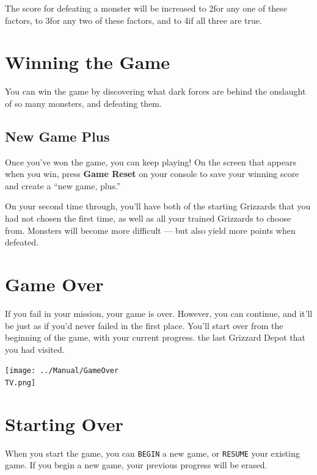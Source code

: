 \documentclass[10pt,twocolumn,openany,article]{memoir}
\newcommand\TV{NTSC}
\newcommand\TV{PAL}
\newcommand\TV{SECAM}
\begin{document}
The score for  defeating a monster will be increased  to 2\times for any
one of these  factors, to 3\times for  any two of these  factors, and to
4\times if all three are true.

\section{Winning the Game}

You can  win the  game by  discovering what dark  forces are  behind the
onslaught of so many monsters, and defeating them.

\subsection*{New Game Plus}\label{sec:NewGamePlus}

Once  you've won  the game,  you can  keep playing!  On the  screen that
appears when you win, press \textbf{Game  Reset} on your console to save
your winning score and create a ``new game, plus.''

On your second time through, you'll  have both of the starting Grizzards
that you  had not  chosen the first  time, as well  as all  your trained
Grizzards to choose from. Monsters will become more difficult — but also
yield more points when defeated.

\section{Game Over}

If  you fail  in  your mission,  your  game is  over.  However, you  can
continue, and it'll be just as if you'd never failed in the first place.
You'll start over from \ifdefined\NOSAVE the beginning of the game, with
your  current progress.  \else  the  last Grizzard  Depot  that you  had
visited. \fi

\begin{center}
  \texttt{[image: ../Manual/GameOver\\TV.png]}
\end{center}

\section{Starting Over}\label{Starting Your Adventure Over}

\ifdefined\NOSAVE

When  you  start  the  game,  you can  \texttt{BEGIN}  a  new  game,  or
\texttt{RESUME}  your existing  game.  If  you begin  a  new game,  your
previous progress will be erased.
\end{document}
